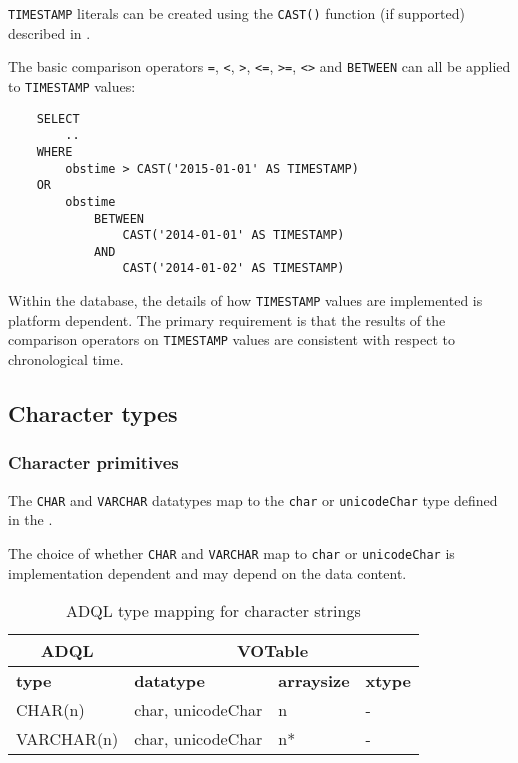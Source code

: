 \documentclass[11pt,a4paper]{ivoa}
\begin{document}
\verb:TIMESTAMP: literals can be created using the \verb:CAST(): function
(if supported) described in .

The basic comparison operators \verb:=:, \verb:<:, \verb:>:, \verb:<=:, \verb:>=:,
\verb:<>: and \verb:BETWEEN: can all be applied to \verb:TIMESTAMP: values:
\begin{verbatim}
    SELECT
        ..
    WHERE
        obstime > CAST('2015-01-01' AS TIMESTAMP)
    OR
        obstime
            BETWEEN
                CAST('2014-01-01' AS TIMESTAMP)
            AND
                CAST('2014-01-02' AS TIMESTAMP)
\end{verbatim}

Within the database, the details of how \verb:TIMESTAMP: values are implemented
is platform dependent. The primary requirement is that the results of the
comparison operators on \verb:TIMESTAMP: values are consistent with respect to
chronological time.

\subsection{Character types}
\label{sec:types.character}

\subsubsection{Character primitives}
\label{sec:types.character.primitive}

The \verb:CHAR: and \verb:VARCHAR: datatypes map to the \verb:char: or
\verb:unicodeChar: type defined in the \VOTableSpec{}.

The choice of whether \verb:CHAR: and \verb:VARCHAR: map to \verb:char: or
\verb:unicodeChar: is implementation dependent and may depend on the data
content.

\begin{table}[th]\footnotesize
    \begin{tabular}
        {|p{}|p{}|p{}|p{}|}

        \hline
        \multicolumn{1}{|c|}{\textbf{ADQL}} &
        \multicolumn{3}{|c|}{\textbf{VOTable}}
        \tabularnewline

        \hline
        \textbf{type} &
        \textbf{datatype} &
        \textbf{arraysize} &
        \textbf{xtype}
        \tabularnewline

        \hline
        CHAR(n) &
        char, unicodeChar &
        n &
        -
        \tabularnewline

        \hline
        VARCHAR(n) &
        char, unicodeChar &
        n* &
        -
        \tabularnewline
        \hline
    \end{tabular}
    \caption{ADQL type mapping for character strings}
    \label{table:types.character.primitive}
\end{table}
\end{document}

